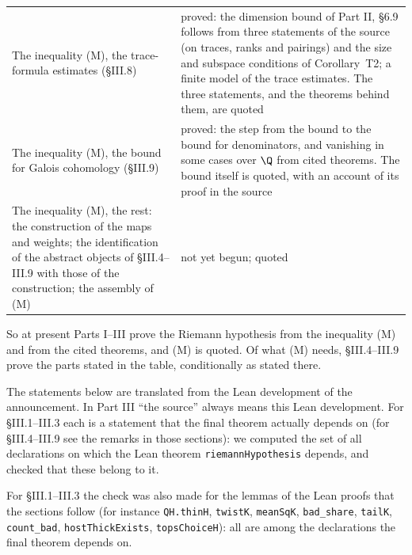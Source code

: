 \documentclass[11pt,letterpaper]{article}
\begin{document}
{\begin{longtable}{p{}p{}}
The inequality (M), the trace-formula estimates (\S III.8) & proved: the dimension bound of Part II, \S6.9 follows from three statements of the source (on traces, ranks and pairings) and the size and subspace conditions of Corollary~T2; a finite model of the trace estimates. The three statements, and the theorems behind them, are quoted\\
The inequality (M), the bound for Galois cohomology (\S III.9) & proved: the step from the bound to the bound for denominators, and vanishing in some cases over $\Q$ from cited theorems. The bound itself is quoted, with an account of its proof in the source\\
The inequality (M), the rest: the construction of the maps and weights; the identification of the abstract objects of \S III.4--III.9 with those of the construction; the assembly of (M) & not yet begun; quoted\\
\end{longtable}}

\noindent So at present Parts I--III prove the Riemann hypothesis from the inequality (M) and from the
cited theorems, and (M) is quoted. Of what (M) needs, \S III.4--III.9 prove the parts stated in the table, conditionally as stated there.

\noindent The statements below are translated from the Lean development of the announcement. In Part III
``the source'' always means this Lean development. For \S III.1--III.3 each is a statement that the
final theorem actually depends on (for \S III.4--III.9 see the remarks in those sections): we computed the set of all declarations on which the Lean theorem
\texttt{riemannHypothesis} depends, and checked that these belong to it.

\noindent For \S III.1--III.3 the check was also made for the lemmas of the Lean proofs that the sections
follow (for instance \texttt{QH.thinH}, \texttt{twistK}, \texttt{meanSqK}, \texttt{bad\_share},
\texttt{tailK}, \texttt{count\_bad}, \texttt{hostThickExists}, \texttt{topsChoiceH}): all are among the
declarations the final theorem depends on.
\end{document}
